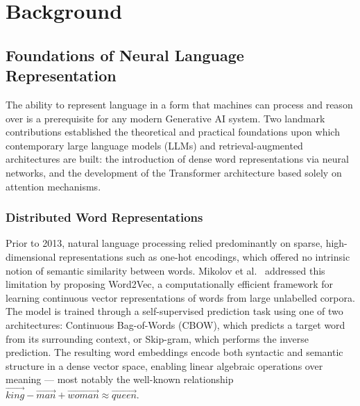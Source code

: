
%

\chapter{Background}
\label{cha:background}

\section{Foundations of Neural Language Representation}
\label{sec:foundations}

The ability to represent language in a form that machines can process and reason
over is a prerequisite for any modern Generative AI system. Two landmark
contributions established the theoretical and practical foundations upon which
contemporary large language models (LLMs) and retrieval-augmented architectures
are built: the introduction of dense word representations via neural networks,
and the development of the Transformer architecture based solely on attention
mechanisms.

\subsection{Distributed Word Representations}
\label{sec:word2vec}

Prior to 2013, natural language processing relied predominantly on sparse,
high-dimensional representations such as one-hot encodings, which offered no
intrinsic notion of semantic similarity between words. Mikolov et
al.~\cite{mikolov2013word2vec} addressed this limitation by proposing
Word2Vec, a computationally efficient framework for learning continuous vector
representations of words from large unlabelled corpora. The model is trained
through a self-supervised prediction task using one of two architectures:
Continuous Bag-of-Words (CBOW), which predicts a target word from its
surrounding context, or Skip-gram, which performs the inverse prediction.
The resulting word embeddings encode both syntactic and semantic structure
in a dense vector space, enabling linear algebraic operations over meaning ---
most notably the well-known relationship \(\vec{king} - \vec{man} + \vec{woman}
\approx \vec{queen}\).

